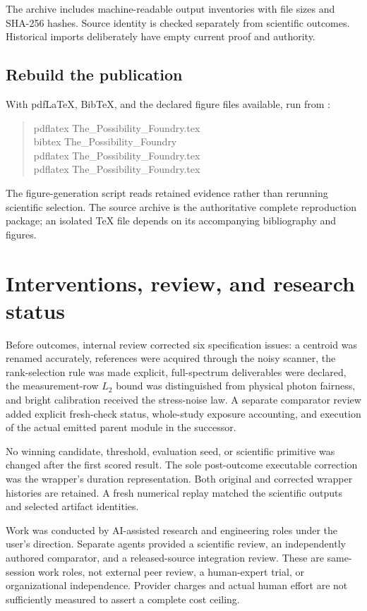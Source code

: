 \documentclass[11pt,a4paper]{article}
\newcommand{\codepath}[1]{\path{#1}}
\begin{document}
The archive includes machine-readable output inventories with file sizes and SHA-256 hashes. Source identity is checked separately from scientific outcomes. Historical imports deliberately have empty current proof and authority.

\subsection{Rebuild the publication}

With pdfLaTeX, BibTeX, and the declared figure files available, run from \codepath{paper/}:
\begin{quote}\small\ttfamily
pdflatex The\_Possibility\_Foundry.tex\\
bibtex The\_Possibility\_Foundry\\
pdflatex The\_Possibility\_Foundry.tex\\
pdflatex The\_Possibility\_Foundry.tex
\end{quote}
The figure-generation script reads retained evidence rather than rerunning scientific selection. The source archive is the authoritative complete reproduction package; an isolated TeX file depends on its accompanying bibliography and figures.

\section{Interventions, review, and research status}

Before outcomes, internal review corrected six specification issues: a centroid was renamed accurately, references were acquired through the noisy scanner, the rank-selection rule was made explicit, full-spectrum deliverables were declared, the measurement-row \(L_2\) bound was distinguished from physical photon fairness, and bright calibration received the stress-noise law. A separate comparator review added explicit fresh-check status, whole-study exposure accounting, and execution of the actual emitted parent module in the successor.

No winning candidate, threshold, evaluation seed, or scientific primitive was changed after the first scored result. The sole post-outcome executable correction was the wrapper's duration representation. Both original and corrected wrapper histories are retained. A fresh numerical replay matched the scientific outputs and selected artifact identities.

Work was conducted by AI-assisted research and engineering roles under the user's direction. Separate agents provided a scientific review, an independently authored comparator, and a released-source integration review. These are same-session work roles, not external peer review, a human-expert trial, or organizational independence. Provider charges and actual human effort are not sufficiently measured to assert a complete cost ceiling.
\end{document}
